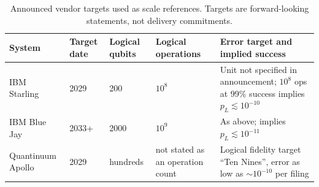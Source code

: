 \documentclass[10pt,a4paper]{article}
\begin{document}
\begin{table}[htbp]
\centering\small
\caption{Announced vendor targets used as scale references. Targets are forward-looking statements, not delivery commitments.}\label{tab:vendor}
\begin{tabular}{@{}L{3.1cm} L{1.6cm} L{2.4cm} L{2.3cm} L{5.0cm}@{}}
\toprule
System & Target date & Logical qubits & Logical operations & Error target and implied success\\\midrule
IBM Starling~\cite{ibmroadmap2025} & 2029 & 200 & $10^8$ & Unit not specified in announcement; $10^8$ ops at 99\% success implies $p_L\lesssim10^{-10}$\\
IBM Blue Jay~\cite{ibmroadmap2025,hpcwire2025} & 2033+ & 2000 & $10^9$ & As above; implies $p_L\lesssim10^{-11}$\\
Quantinuum Apollo~\cite{quantinuum2024,quantFiling} & 2029 & hundreds & not stated as an operation count & Logical fidelity target ``Ten Nines'', error as low as $\sim10^{-10}$ per filing\\
\bottomrule
\end{tabular}
\end{table}
\end{document}
